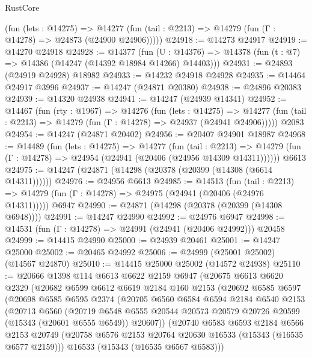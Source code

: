 \begin{lexlean}{RustCore}
\begin{coremodule}
      (fun (lets : @14275) =>
      @14277 (fun (tail : @2213) => @14279 (fun (Γ : @14278) => @24873 (@24900 @24906)))))
@24918 := @14273 @24917
@24919 := @14270 @24918
@24928 := @14377
    (fun (U : @14376) => @14378 (fun (t : @7) => @14386 (@14247 (@14392 @18984 @14266) @14403)))
@24931 := @24893 (@24919 @24928) @18982
@24933 := @14232 @24918 @24928
@24935 := @14464 @24917 @3996
@24937 := @14247 (@24871 @20380)
@24938 := @24896 @20383
@24939 := @14320 @24938
@24941 := @14247 (@24939 @14341)
@24952 := @14467
    (fun (rty : @1967) =>
    @14276
      (fun (lets : @14275) =>
      @14277 (fun (tail : @2213) => @14279 (fun (Γ : @14278) => @24937 (@24941 @24906)))))
    @2083
@24954 := @14247 (@24871 @20402)
@24956 := @20407 @24901 @18987
@24968 := @14489
    (fun (lets : @14275) =>
    @14277
      (fun (tail : @2213) =>
      @14279 (fun (Γ : @14278) => @24954 (@24941 (@20406 (@24956 @14309 @14311))))))
    @6613
@24975 := @14247 (@24871 (@14298 (@20378 (@20399 (@14308 (@6614 @14311))))))
@24976 := @24956 @6613
@24985 := @14513
    (fun (tail : @2213) => @14279 (fun (Γ : @14278) => @24975 (@24941 (@20406 (@24976 @14311)))))
    @6947
@24990 := @24871 (@14298 (@20378 (@20399 (@14308 @6948))))
@24991 := @14247 @24990
@24992 := @24976 @6947
@24998 := @14531 (fun (Γ : @14278) => @24991 (@24941 (@20406 @24992))) @20458
@24999 := @14415 @24990
@25000 := @24939 @20461
@25001 := @14247 @25000
@25002 := @20465 @24992
@25006 := @24999 (@25001 @25002) (@14567 @24870)
@25010 := @14415 @25000 @25002 (@14572 @24938)
@25110 := @20666
    @1398
    @114
    @6613
    @6622
    @2159
    @6947
    (@20675
      @6613
      @6620
      @2329
      (@20682
        @6599
        @6612
        @6619
        @2184
        @160
        @2153
        (@20692
          @6585
          @6597
          (@20698
            @6585
            @6595
            @2374
            (@20705
              @6560
              @6584
              @6594
              @2184
              @6540
              @2153
              (@20713
                @6560
                (@20719
                  @6548
                  @6555
                  @20544
                  @20573
                  @20579
                  @20726
                  @20599
                  (@15343 (@20601 @6555 @6549))
                  @20607))
              (@20740
                @6583
                @6593
                @2184
                @6566
                @2153
                @20749
                (@20758 @6576 @2153 @20764 @20630 @16533 (@15343 (@16535 @6577 @2159)))
                @16533
                (@15343 (@16535 @6567 @6583)))

\end{coremodule}
\end{lexlean}
